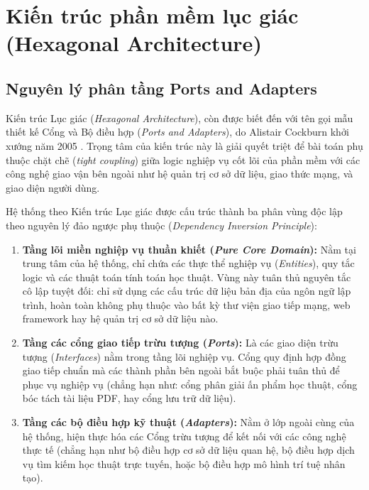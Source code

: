 \section[Kiến trúc phần mềm lục giác (Hexagonal Architecture)]{Kiến trúc phần mềm lục giác\\(Hexagonal Architecture)}
\label{sec:hexagonal}

\subsection{Nguyên lý phân tầng Ports and Adapters}
\label{subsec:ports_and_adapters}
Kiến trúc Lục giác (\textit{Hexagonal Architecture}), còn được biết đến với tên gọi mẫu thiết kế Cổng và Bộ điều hợp (\textit{Ports and Adapters}), do Alistair Cockburn khởi xướng năm 2005 \cite{cockburn2005}. Trọng tâm của kiến trúc này là giải quyết triệt để bài toán phụ thuộc chặt chẽ (\textit{tight coupling}) giữa logic nghiệp vụ cốt lõi của phần mềm với các công nghệ giao vận bên ngoài như hệ quản trị cơ sở dữ liệu, giao thức mạng, và giao diện người dùng.

Hệ thống theo Kiến trúc Lục giác được cấu trúc thành ba phân vùng độc lập theo nguyên lý đảo ngược phụ thuộc (\textit{Dependency Inversion Principle}):
\begin{enumerate}[label=\textbf{(\arabic*)}]
    \item \textbf{Tầng lõi miền nghiệp vụ thuần khiết (\textit{Pure Core Domain}):} Nằm tại trung tâm của hệ thống, chỉ chứa các thực thể nghiệp vụ (\textit{Entities}), quy tắc logic và các thuật toán tính toán học thuật. Vùng này tuân thủ nguyên tắc cô lập tuyệt đối: chỉ sử dụng các cấu trúc dữ liệu bản địa của ngôn ngữ lập trình, hoàn toàn không phụ thuộc vào bất kỳ thư viện giao tiếp mạng, web framework hay hệ quản trị cơ sở dữ liệu nào.
    \item \textbf{Tầng các cổng giao tiếp trừu tượng (\textit{Ports}):} Là các giao diện trừu tượng (\textit{Interfaces}) nằm trong tầng lõi nghiệp vụ. Cổng quy định hợp đồng giao tiếp chuẩn mà các thành phần bên ngoài bắt buộc phải tuân thủ để phục vụ nghiệp vụ (chẳng hạn như: cổng phân giải ấn phẩm học thuật, cổng bóc tách tài liệu PDF, hay cổng lưu trữ dữ liệu).
    \item \textbf{Tầng các bộ điều hợp kỹ thuật (\textit{Adapters}):} Nằm ở lớp ngoài cùng của hệ thống, hiện thực hóa các Cổng trừu tượng để kết nối với các công nghệ thực tế (chẳng hạn như bộ điều hợp cơ sở dữ liệu quan hệ, bộ điều hợp dịch vụ tìm kiếm học thuật trực tuyến, hoặc bộ điều hợp mô hình trí tuệ nhân tạo).
\end{enumerate}

